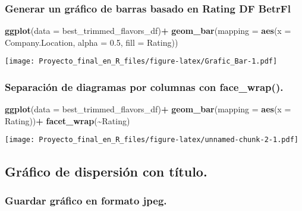 \documentclass[
]{article}
\newenvironment{Shaded}{\begin{snugshade}}{\end{snugshade}}
\newcommand{\AttributeTok}[1]{\textcolor[rgb]{0.13,0.29,0.53}{#1}}
\newcommand{\FloatTok}[1]{\textcolor[rgb]{0.00,0.00,0.81}{#1}}
\newcommand{\FunctionTok}[1]{\textcolor[rgb]{0.13,0.29,0.53}{\textbf{#1}}}
\newcommand{\NormalTok}[1]{#1}
\newcommand{\SpecialCharTok}[1]{\textcolor[rgb]{0.81,0.36,0.00}{\textbf{#1}}}
\begin{document}
\subsubsection{Generar un gráfico de barras basado en Rating DF
BetrFl}\label{generar-un-gruxe1fico-de-barras-basado-en-rating-df-betrfl}

\begin{Shaded}
\begin{Highlighting}[]
\FunctionTok{ggplot}\NormalTok{(}\AttributeTok{data =}\NormalTok{ best\_trimmed\_flavors\_df)}\SpecialCharTok{+}
  \FunctionTok{geom\_bar}\NormalTok{(}\AttributeTok{mapping =} \FunctionTok{aes}\NormalTok{(}\AttributeTok{x =}\NormalTok{ Company.Location, }\AttributeTok{alpha =} \FloatTok{0.5}\NormalTok{, }\AttributeTok{fill =}\NormalTok{ Rating))}
\end{Highlighting}
\end{Shaded}

\texttt{[image: Proyecto\_final\_en\_R\_files/figure-latex/Grafic\_Bar-1.pdf]}

\subsubsection{Separación de diagramas por columnas con
face\_wrap().}\label{separaciuxf3n-de-diagramas-por-columnas-con-face_wrap.}

\begin{Shaded}
\begin{Highlighting}[]
\FunctionTok{ggplot}\NormalTok{(}\AttributeTok{data =}\NormalTok{ best\_trimmed\_flavors\_df)}\SpecialCharTok{+}
  \FunctionTok{geom\_bar}\NormalTok{(}\AttributeTok{mapping =} \FunctionTok{aes}\NormalTok{(}\AttributeTok{x =}\NormalTok{ Rating))}\SpecialCharTok{+}
  \FunctionTok{facet\_wrap}\NormalTok{(}\SpecialCharTok{\textasciitilde{}}\NormalTok{Rating)}
\end{Highlighting}
\end{Shaded}

\texttt{[image: Proyecto\_final\_en\_R\_files/figure-latex/unnamed-chunk-2-1.pdf]}

\subsection{Gráfico de dispersión con
título.}\label{gruxe1fico-de-dispersiuxf3n-con-tuxedtulo.}

\subsubsection{Guardar gráfico en formato
jpeg.}\label{guardar-gruxe1fico-en-formato-jpeg.}
\end{document}
